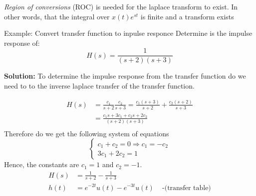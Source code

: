 \begin{multicols}{2}
\textit{Region of conversions} (ROC) is needed for the laplace transform to exist.
In other words, that the integral over $x(t)e^{st}$ is finite and a transform exists

\begin{exampleblock}{Example: Convert transfer function to inpulse responce}
Determine is the impulse response of:
\begin{equation*}
    H(s) = \frac{1}{(s+2)(s+3)}
\end{equation*}

\textbf{Solution:}
To determine the impulse response from the transfer function do we need to to the inverse laplace 
transfer of the transfer function.

\begin{align*}
    H(s) &= \frac{c_1}{s+2} \frac{c_2}{s+3} = \frac{c_1(s+3)}{s+2} + \frac{c_2(s+2)}{s+3} \\
    &= \frac{c_1s+3c_1 + c_2s+2c_2}{(s+2)(s+3)} \\
\end{align*}
Therefore do we get the following system of equations
\begin{equation*}
    \left\{\begin{array}{ll}
        c_1+c_2   = 0 \Rightarrow c_1=-c_2 \\
        3c_1+2c_2 = 1 
    \end{array}\right.
\end{equation*}
Hence, the constants are $c_1=1$ and $c_2=-1$.
\begin{align*}
   H(s) &= \frac{1}{s+2} - \frac{1}{s+3}  \\
   h(t) &= e^{-2t}u(t) - e^{-3t}u(t) \;\;\; \text{ -(transfer table)}
\end{align*}
\end{exampleblock}
\end{multicols}
\raggedcolumns


